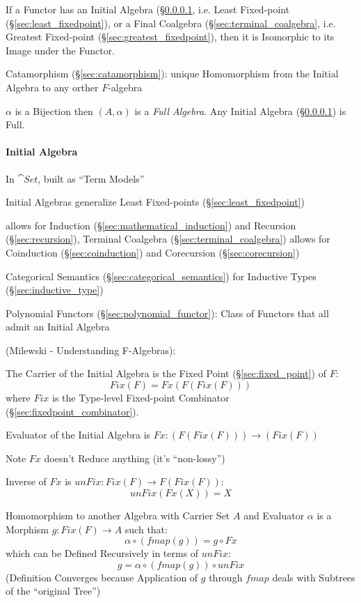 If a Functor has an Initial Algebra (\S\ref{sec:initial_algebra},
i.e. Least Fixed-point (\S\ref{sec:least_fixedpoint}), or a Final
Coalgebra (\S\ref{sec:terminal_coalgebra}, i.e. Greatest Fixed-point
(\S\ref{sec:greatest_fixedpoint}), then it is Isomorphic to its Image
under the Functor. \cite{corfield08}

Catamorphism (\S\ref{sec:catamorphism}): unique Homomorphism from the
Initial Algebra to any orther $F$-algebra

$\alpha$ is a Bijection then $(A,\alpha)$ is a \emph{Full Algebra}.
Any Initial Algebra (\S\ref{sec:initial_algebra}) is Full.
\cite{aczel88}



\paragraph{Initial Algebra}\label{sec:initial_algebra}\hfill

In $\cat{Set}$, built as ``Term Models'' \cite{corfield08} %

Initial Algebras generalize Least Fixed-points
(\S\ref{sec:least_fixedpoint}) \cite{rutten00}

allows for Induction (\S\ref{sec:mathematical_induction}) and
Recursion (\S\ref{sec:recursion}), Terminal Coalgebra
(\S\ref{sec:terminal_coalgebra}) allows for Coinduction
(\S\ref{sec:coinduction}) and Corecursion (\S\ref{sec:corecursion})

Categorical Semantics (\S\ref{sec:categorical_semantics}) for
Inductive Types (\S\ref{sec:inductive_type})

Polynomial Functors (\S\ref{sec:polynomial_functor}): Class of
Functors that all admit an Initial Algebra %

(Milewski - Understanding F-Algebras):

The Carrier of the Initial Algebra is the Fixed Point
(\S\ref{sec:fixed_point}) of $F$:
\[
  Fix (F) = Fx (F (Fix (F)))
\]
where $Fix$ is the Type-level Fixed-point Combinator
(\S\ref{sec:fixedpoint_combinator}).

Evaluator of the Initial Algebra is $Fx : (F (Fix (F))) \rightarrow
(Fix (F))$

\fist Note $Fx$ doesn't Reduce anything (it's ``non-lossy'')

Inverse of $Fx$ is $unFix : Fix (F) \rightarrow F (Fix (F))$:
\[
  unFix (Fx (X)) = X
\]

Homomorphism to another Algebra with Carrier Set $A$ and Evaluator
$\alpha$ is a Morphism $g : Fix (F) \rightarrow A$ such that:
\[
  \alpha \circ (fmap (g)) = g \circ Fx
\]
which can be Defined Recursively in terms of $unFix$:
\[
  g = \alpha \circ (fmap (g)) \circ unFix
\]
(Definition Converges because Application of $g$ through $fmap$ deals
with Subtrees of the ``original Tree'')

